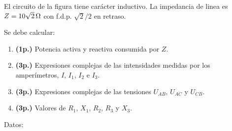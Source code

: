 \documentclass[12pt]{article}
\begin{document}
\begin{enumerate}[resume]







El circuito de la figura tiene carácter inductivo.  La impedancia de
linea es $Z=\SI[parse-numbers=false]{10\sqrt{2}}{\ohm}$ con
f.d.p. $\sqrt{2}/2$ en retraso. 

Se debe calcular:

\begin{enumerate}

\item \textbf{(1p.)} Potencia activa y reactiva consumida por $Z$.

\item  \textbf{(3p.)} Expresiones complejas de las intensidades medidas por los
  amperímetros, $I$, $I_1$, $I_2$ e $I_3$. 

\item  \textbf{(3p.)} Expresiones complejas de las tensiones $U_{AB}$, $U_{AC}$ y
  $U_{CB}$.

\item  \textbf{(3p.)} Valores de $R_1$, $X_1$, $R_2$, $R_3$ y $X_3$.

\end{enumerate}

Datos:
\begin{itemize}


\end{itemize}
\end{enumerate}
\end{document}
